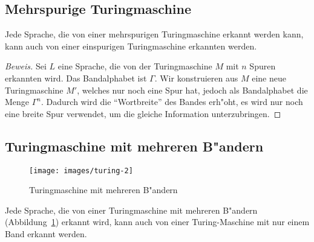 \subsection{Mehrspurige Turingmaschine}
\begin{satz}\label{mehrspurigeturingmaschine}
Jede Sprache, die von einer mehrspurigen Turingmaschine
erkannt werden kann, kann auch von einer einspurigen Turingmaschine
erkannten werden.
\end{satz}

\begin{proof}[Beweis]
Sei $L$ eine Sprache, die von der Turingmaschine $M$ mit $n$ Spuren
erkannten wird. Das Bandalphabet ist $\Gamma$. Wir konstruieren aus
$M$ eine neue Turingmaschine $M'$, welches nur noch eine Spur hat,
jedoch als Bandalphabet die Menge $\Gamma^n$. Dadurch wird die ``Wortbreite''
des Bandes erh"oht, es wird nur noch eine breite Spur verwendet, um die
gleiche Information unterzubringen.
\end{proof}

\subsection{Turingmaschine mit mehreren B"andern}
\begin{figure}
\begin{center}
\texttt{[image: images/turing-2]}
\end{center}
\caption{Turingmaschine mit mehreren B"andern\label{multitapetm}}
\end{figure}
\begin{satz}
\label{mehrbandturingmaschine}
Jede Sprache, die von einer Turingmaschine mit mehreren B"andern
(Abbildung~\ref{multitapetm})
erkannt
wird, kann auch von einer Turing-Maschine mit nur einem Band erkannt
werden.
\end{satz}


